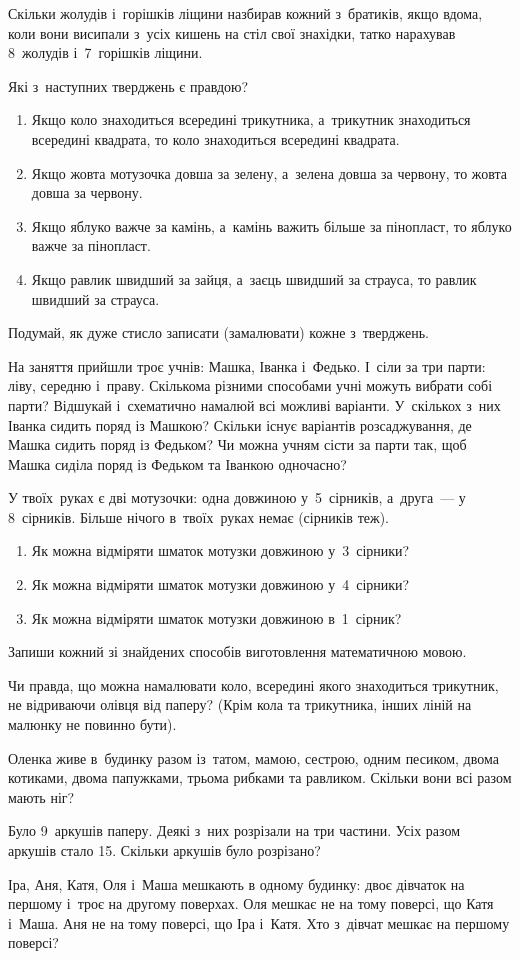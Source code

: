 Скільки жолудів і~горішків ліщини назбирав кожний з~братиків,
якщо вдома, коли вони висипали з~усіх кишень на стіл свої знахідки,
татко нарахував 8~жолудів і~7~горішків ліщини.


\problem
Які з~наступних тверджень є правдою?
\begin{enumerate}
    \item Якщо коло знаходиться всередині трикутника,
    а~трикутник знаходиться всередині квадрата,
    то коло знаходиться всередині квадрата.
    \item Якщо жовта мотузочка довша за зелену,
    а~зелена довша за червону, то жовта довша за червону.
    \item Якщо яблуко важче за камінь, а~камінь важить більше за пінопласт,
    то яблуко важче за пінопласт.
    \item Якщо равлик швидший за зайця, а~заєць швидший за страуса,
    то равлик швидший за страуса.
\end{enumerate}
Подумай, як дуже стисло записати (замалювати) кожне з~тверджень.


\problem
На заняття прийшли троє учнів: Машка, Іванка і~Федько.
І~сіли за три парти: ліву, середню і~праву.
Скількома різними способами учні можуть вибрати собі парти?
Відшукай і~схематично намалюй всі можливі варіанти.
У~скількох з~них Іванка сидить поряд із Машкою?
Скільки існує варіантів розсаджування, де Машка сидить поряд із Федьком?
Чи можна учням сісти за парти так,
щоб Машка сиділа поряд із Федьком та Іванкою одночасно?



\problem
У твоїх~руках є дві мотузочки:
одна довжиною у~5~сірників, а~друга~--- у 8~сірників.
Більше нічого в~твоїх~руках немає (сірників теж).
\begin{enumerate}
    \item Як можна відміряти шматок мотузки довжиною у~3~сірники?
    \item Як можна відміряти шматок мотузки довжиною у~4~сірники?
    \item Як можна відміряти шматок мотузки довжиною в~1~сірник?
\end{enumerate}
Запиши кожний зі знайдених способів виготовлення математичною мовою.


\problem
Чи правда, що можна намалювати коло, всередині якого знаходиться
трикутник, не відриваючи олівця від паперу?
(Крім кола та трикутника, інших ліній на малюнку не повинно бути).


\problem
Оленка живе в~будинку разом із~татом, мамою, сестрою, одним песиком,
двома котиками, двома папужками, трьома рибками та равликом.
Скільки вони всі разом мають ніг?


\problem
Було 9~аркушів паперу. Деякі з~них розрізали на три частини.
Усіх разом аркушів стало 15.
Скільки аркушів було розрізано?


\problem
Іра, Аня, Катя, Оля і~Маша мешкають в одному будинку:
двоє дівчаток на першому і~троє на другому поверхах.
Оля мешкає не на тому поверсі, що Катя і~Маша.
Аня не на тому поверсі, що Іра і~Катя.
Хто з~дівчат мешкає на першому поверсі?
